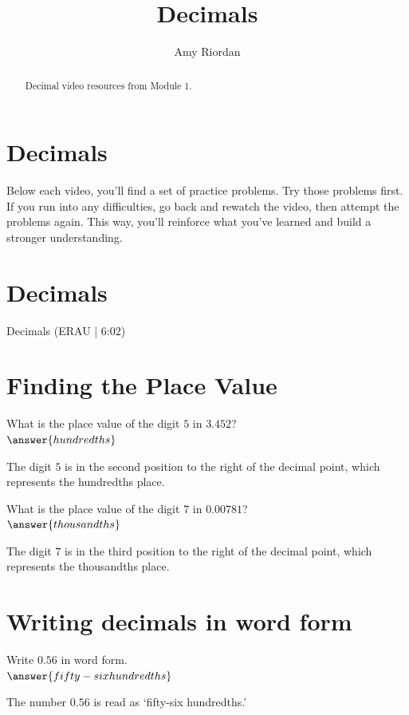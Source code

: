 \documentclass{ximera}
\title{Decimals}
\author{Amy Riordan}
\begin{document}
\begin{abstract}
Decimal video resources from Module 1.
\end{abstract}
\maketitle

\section*{Decimals}

Below each video, you’ll find a set of practice problems. Try those problems first. If you run into any difficulties, go back and rewatch the video, then attempt the problems again. This way, you’ll reinforce what you’ve learned and build a stronger understanding.

\section*{Decimals}

Decimals (ERAU | 6:02)



\section*{Finding the Place Value}
\begin{problem}
What is the place value of the digit $5$ in $3.452$?\\
$\answer{hundredths}$
\begin{feedback}
The digit $5$ is in the second position to the right of the decimal point, which represents the hundredths place.
\end{feedback}
\end{problem}

\begin{problem}
What is the place value of the digit $7$ in $0.00781$?\\
$\answer{thousandths}$
\begin{feedback}
The digit $7$ is in the third position to the right of the decimal point, which represents the thousandths place.
\end{feedback}
\end{problem}

\section*{Writing decimals in word form}
\begin{problem}
Write $0.56$ in word form.\\
$\answer{fifty-six hundredths}$
\begin{feedback}
The number $0.56$ is read as `fifty-six hundredths.'
\end{feedback}
\end{problem}
\end{document}

